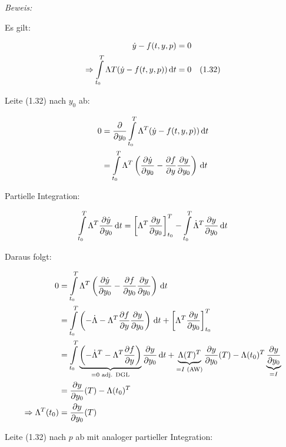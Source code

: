 \emph{Beweis:}

Es gilt:

\begin{align*}
\dot y - f(t,y,p) &= 0 \\
\Rightarrow \int\limits_{t_0}^T \Lambda T (\dot y - f(t,y,p)) \,\mathrm d t &= 0 & (1.32)
\end{align*}

Leite (1.32) nach $y_0$ ab:

\begin{align*}
0 &= \frac{\partial}{\partial y_0} \int\limits_{t_0}^T \Lambda^T (\dot y -f(t,y,p)) \,\mathrm d t \\
&= \int\limits_{t_0}^T \Lambda^T \left( \frac{\partial \dot y}{\partial y_0} - \frac{\partial f}{\partial y} \frac{\partial y}{\partial y_0} \right) \,\mathrm d t
\end{align*}

Partielle Integration:

\[ \int\limits_{t_0}^T \Lambda^T \frac{\partial \dot y}{\partial y_0} \,\mathrm d t = \left[ \Lambda^T \frac{\partial y}{\partial y_0} \right]_{t_0}^T - \int\limits_{t_0}^T \dot \Lambda^T \frac{\partial y}{\partial y_0} \,\mathrm d t \]

Daraus folgt:

\begin{align*}
0 &= \int\limits_{t_0}^T \Lambda^T \left( \frac{\partial \dot y}{\partial y_0} - \frac{\partial f}{\partial y_0} \frac{\partial y}{\partial y_0} \right) \,\mathrm d t \\
&= \int\limits_{t_0}^T \left( -\dot \Lambda - \Lambda^T \frac{\partial f}{\partial y} \frac{\partial y}{\partial y_0} \right) \,\mathrm d t + \left[\Lambda^T \frac{\partial y}{\partial y_0} \right]_{t_0}^T \\
&= \int\limits_{t_0}^T \underbrace{\left( -\dot \Lambda^T - \Lambda^T \frac{\partial f}{\partial y} \right)}_{= 0 \text{ adj. DGL}} \frac{\partial y}{\partial y_0} \,\mathrm d t + \underbrace{\Lambda(T)^T}_{=I \text{ (AW)}} \frac{\partial y}{\partial y_0}(T) - \Lambda(t_0)^T \underbrace{\frac{\partial y}{\partial y_0}}_{=I} \\
&= \frac{\partial y}{\partial y_0} (T) - \Lambda(t_0)^T \\
\Rightarrow \Lambda^T(t_0) &= \frac{\partial y}{\partial y_0} (T) 
\end{align*}

Leite (1.32) nach $p$ ab mit analoger partieller Integration:

